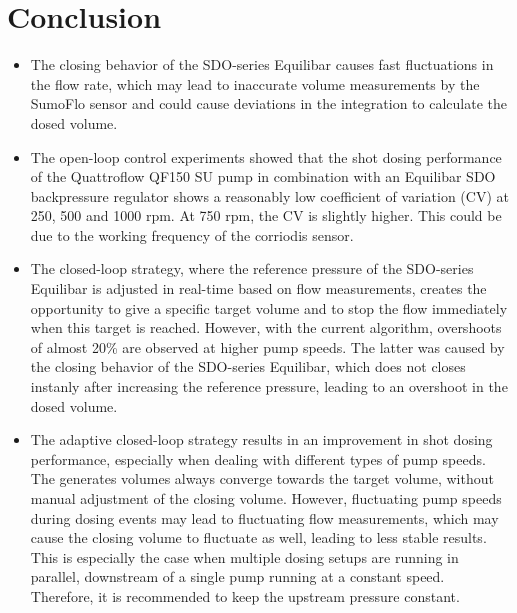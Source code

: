 \documentclass[12pt,a4paper]{article}
\begin{document}
\section{Conclusion}
\label{sec:conclusion}
\begin{itemize}
    \item The closing behavior of the SDO-series Equilibar causes fast fluctuations in the flow rate, which may lead to inaccurate volume measurements by the SumoFlo sensor and could cause deviations in the integration to calculate the dosed volume.
    \item The open-loop control experiments showed that the shot dosing performance of the Quattroflow QF150 SU pump in combination with an Equilibar SDO backpressure regulator shows a reasonably low coefficient of variation (CV) at 250, 500 and 1000 rpm. At 750 rpm, the CV is slightly higher. This could be due to the working frequency of the corriodis sensor.
    \item The closed-loop strategy, where the reference pressure of the SDO-series Equilibar is adjusted in real-time based on flow measurements, creates the opportunity to give a specific target volume and to stop the flow immediately when this target is reached. However, with the current algorithm, overshoots of almost 20\% are observed at higher pump speeds. The latter was caused by the closing behavior of the SDO-series Equilibar, which does not closes instanly after increasing the reference pressure, leading to an overshoot in the dosed volume.
    \item The adaptive closed-loop strategy results in an improvement in shot dosing performance, especially when dealing with different types of pump speeds. The generates volumes always converge towards the target volume, without manual adjustment of the closing volume. However, fluctuating pump speeds during dosing events may lead to fluctuating flow measurements, which may cause the closing volume to fluctuate as well, leading to less stable results. This is especially the case when multiple dosing setups are running in parallel, downstream of a single pump running at a constant speed. Therefore, it is recommended to keep the upstream pressure constant. 
\end{itemize}

\clearpage
\end{document}
